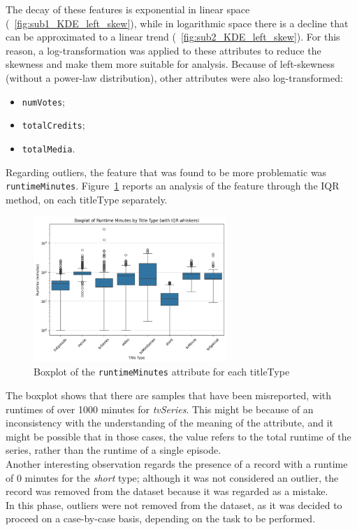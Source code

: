 The decay of these features is exponential in linear space (~\ref{fig:sub1_KDE_left_skew}), while in logarithmic space there is a decline that can be approximated to a linear trend (~\ref{fig:sub2_KDE_left_skew}). 
For this reason, a log-transformation was applied to these attributes to reduce the skewness and make them more suitable for analysis.
 Because of left-skewness (without a power-law distribution), other attributes were also log-transformed:
\begin{itemize}
    \item \texttt{numVotes};
    \item \texttt{totalCredits};
    \item \texttt{totalMedia}.
\end{itemize}


Regarding outliers, the feature that was found to be more problematic was \texttt{runtimeMinutes}. Figure~\ref{fig:runtimeMinutes_boxplot} reports an analysis of the feature through the IQR method, on each titleType separately.

\begin{figure}[H]
    \centering
    \includegraphics[width=0.65\textwidth]{plots/outliers.png}
    \caption{Boxplot of the \texttt{runtimeMinutes} attribute for each titleType}
    \label{fig:runtimeMinutes_boxplot}
\end{figure}

The boxplot shows that there are samples that have been misreported, with runtimes of over 1000 minutes for \textit{tvSeries}. This might be because of an inconsistency with the understanding of the meaning of the attribute, and it might be possible that in those cases, the value refers to the total runtime of the series, rather than the runtime of a single episode.\\

Another interesting observation regards the presence of a record with a runtime of 0 minutes for the \textit{short} type; although it was not considered an outlier, the record was removed from the dataset because it was regarded as a mistake.\\

In this phase, outliers were not removed from the dataset, as it was decided to proceed on a case-by-case basis, depending on the task to be performed.\\